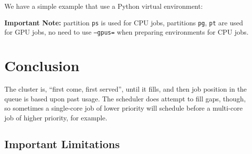 \documentclass{easychair}
\begin{document}
We have a simple example that use a Python virtual environment:


\noindent
\textbf{Important Note:} partition \texttt{ps} is used for CPU jobs, partitions \texttt{pg}, \texttt{pt} are used
for GPU jobs, no need to use \texttt{--gpus=} when preparing environments for CPU jobs.



\section{Conclusion}
\label{sect:conclusion}

The cluster is, ``first come, first served'', until it fills, and then job
position in the queue is based upon past usage. The scheduler does attempt
to fill gaps, though, so sometimes a single-core job of lower priority
will schedule before a multi-core job of higher priority, for example.

\subsection{Important Limitations}
\label{sect:limitations}
\end{document}
